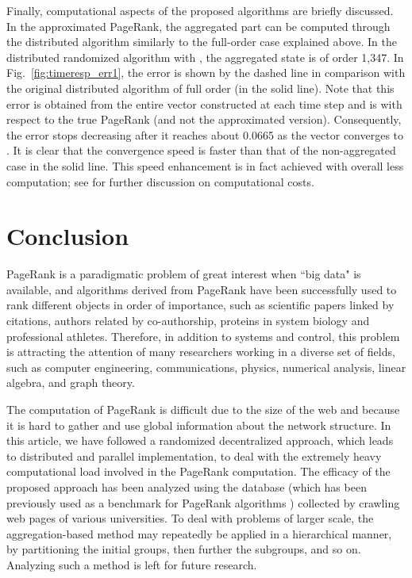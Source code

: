 \documentclass[11pt,draftcls,onecolumn]{IEEEtran}
\begin{document}
\begin{table}[t]
Finally, computational aspects of the proposed algorithms are
briefly discussed.
In the approximated PageRank, the aggregated part can be computed through the
distributed algorithm similarly to the full-order case explained above. 
In the distributed randomized algorithm with , the aggregated state 
is of order 1,347. In Fig.~\ref{fig:timeresp_err1}, the error is shown by the dashed line 
in comparison with the original distributed algorithm of full order (in the solid line).
Note that this error is obtained from the entire vector  constructed at 
each time step and is with respect to the true PageRank
(and not the approximated version). Consequently,
the error stops decreasing after it reaches about 0.0665 as the vector  converges 
to .
It is clear that the convergence speed is faster than that of the 
non-aggregated case in the solid line. 
This speed enhancement is in fact achieved with overall less computation; see \cite{IshTemBai:12}
for further discussion on computational costs.

\section*{Conclusion}
\label{sec:concl}

PageRank is a paradigmatic problem 
of great interest when ``big data" is available, and algorithms derived 
from PageRank have been successfully used to rank different objects in 
order of importance, such as scientific papers linked by citations, 
authors related by co-authorship, proteins in system biology and professional 
athletes. Therefore, in addition to systems and control, this problem is 
attracting the attention of many researchers working in a diverse set of fields, 
such as computer engineering, communications, physics, numerical analysis, 
linear algebra, and graph theory. 

The computation of PageRank is difficult due to the size of the web and because it is hard to gather and use global information about the network structure. 
In this article, we have followed a randomized decentralized approach, which leads to distributed
and parallel implementation, 
to deal with the extremely heavy computational load involved in the PageRank computation. The efficacy of the proposed approach
has been analyzed using the database \cite{webdata} 
(which has been previously used as a benchmark for PageRank algorithms \cite{FABG:13})
collected by crawling web pages of various universities.
To deal with problems of larger scale, the aggregation-based method
may repeatedly be applied in a hierarchical manner, by partitioning the initial groups,
then further the subgroups, and so on. 
Analyzing such a method is left for future research.



\end{table}
\end{document}
